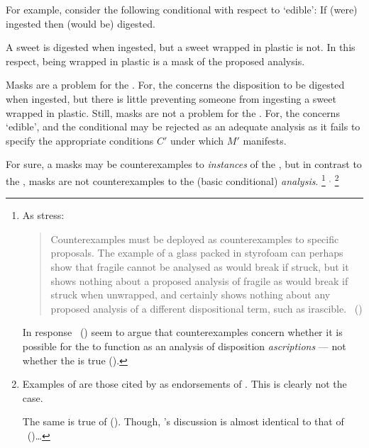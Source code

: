 \begin{note}
  For example, consider the following conditional with respect to `edible':
  If (were) ingested then (would be) digested.

  A sweet is digested when ingested, but a sweet wrapped in plastic is not.
  In this respect, being wrapped in plastic is a mask of the proposed analysis.

  Masks are a problem for the \dSCAa{}.
  For, the \dSCAa{} concerns the disposition to be digested when ingested, but there is little preventing someone from ingesting a sweet wrapped in plastic.
  Still, masks are not a problem for the \dBCAa{}.
  For, the \dBCAa{} concerns `edible', and the conditional may be rejected as an adequate analysis as it fails to specify the appropriate conditions \(C'\) under which \(M'\) manifests.

  For sure, a masks may be counterexamples to \emph{instances} of the \dBCAa{}, but in contrast to the \dSCAa{}, masks are not counterexamples to the (basic conditional) \emph{analysis}.%
  \footnote{
    As \citeauthor{Bonevac:2011tz} stress:
    \begin{quote}
      Counterexamples must be deployed as counterexamples to specific proposals.
      The example of a glass packed in styrofoam can perhaps show that fragile cannot be analysed as would break if struck, but it shows nothing about a proposed analysis of fragile as would break if struck when unwrapped, and certainly shows nothing about any proposed analysis of a different dispositional term, such as irascible.%
      \mbox{ }\hfill\mbox{(\citeyear[1144]{Bonevac:2011tz})}
    \end{quote}

    \nocite{Manley:2007aa}
    In response~\citeauthor{Manley:2011aa} (\citeyear{Manley:2011aa}) seem to argue that counterexamples concern whether it is possible for the  to function as an analysis of disposition \emph{ascriptions} --- not whether the  is true (\citeyear[cf.][\S1.3]{Manley:2011aa}).
  }%
  \(^{,}\)%
  \footnote{
    Examples of  are those cited by \citeauthor{Choi:2021wg} as endorsements of .
    This is clearly not the case.

    The same is true of \citeauthor{Manley:2008aa} (\citeyear[60]{Manley:2008aa}).
    Though, \citeauthor{Manley:2008aa}'s discussion is almost identical to that of \citeauthor{Fara:2006aa}~(\citeyear[\S2.1]{Fara:2006aa})\dots

}
\end{note}
